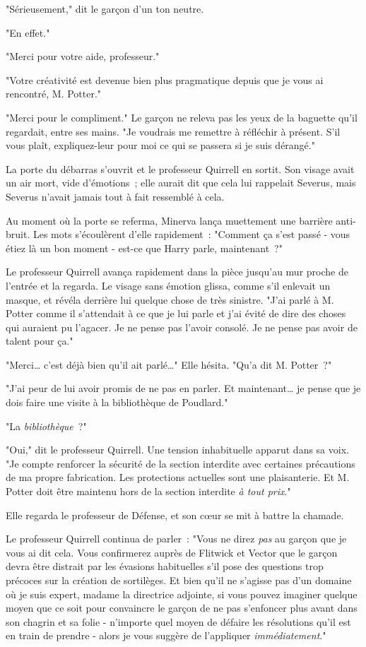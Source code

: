 "Sérieusement," dit le garçon d'un ton neutre.

"En effet."

"Merci pour votre aide, professeur."

"Votre créativité est devenue bien plus pragmatique depuis que je vous ai rencontré, M. Potter."

"Merci pour le compliment." Le garçon ne releva pas les yeux de la baguette qu'il regardait, entre ses mains. "Je voudrais me remettre à réfléchir à présent. S'il vous plaît, expliquez-leur pour moi ce qui se passera si je suis dérangé."

\later

La porte du débarras s'ouvrit et le professeur Quirrell en sortit. Son visage avait un air mort, vide d'émotions~; elle aurait dit que cela lui rappelait Severus, mais Severus n'avait jamais tout à fait ressemblé à cela.

Au moment où la porte se referma, Minerva lança muettement une barrière anti-bruit. Les mots s'écoulèrent d'elle rapidement~: "Comment ça s'est passé - vous étiez là un bon moment - est-ce que Harry parle, maintenant~?"

Le professeur Quirrell avança rapidement dans la pièce jusqu'au mur proche de l'entrée et la regarda. Le visage sans émotion glissa, comme s'il enlevait un masque, et révéla derrière lui quelque chose de très sinistre. "J'ai parlé à M. Potter comme il s'attendait à ce que je lui parle et j'ai évité de dire des choses qui auraient pu l'agacer. Je ne pense pas l'avoir consolé. Je ne pense pas avoir de talent pour ça."

"Merci… c'est déjà bien qu'il ait parlé…" Elle hésita. "Qu'a dit M. Potter~?"

"J'ai peur de lui avoir promis de ne pas en parler. Et maintenant… je pense que je dois faire une visite à la bibliothèque de Poudlard."

"La \emph{bibliothèque}~?"

"Oui," dit le professeur Quirrell. Une tension inhabituelle apparut dans sa voix. "Je compte renforcer la sécurité de la section interdite avec certaines précautions de ma propre fabrication. Les protections actuelles sont une plaisanterie. Et M. Potter doit être maintenu hors de la section interdite \emph{à tout prix}."

Elle regarda le professeur de Défense, et son cœur se mit à battre la chamade.

Le professeur Quirrell continua de parler~: "Vous ne direz \emph{pas} au garçon que je vous ai dit cela. Vous confirmerez auprès de Flitwick et Vector que le garçon devra être distrait par les évasions habituelles s'il pose des questions trop précoces sur la création de sortilèges. Et bien qu'il ne s'agisse pas d'un domaine où je suis expert, madame la directrice adjointe, si vous pouvez imaginer quelque moyen que ce soit pour convaincre le garçon de ne pas s'enfoncer plus avant dans son chagrin et sa folie - n'importe quel moyen de défaire les résolutions qu'il est en train de prendre - alors je vous suggère de l'appliquer \emph{immédiatement}." 
